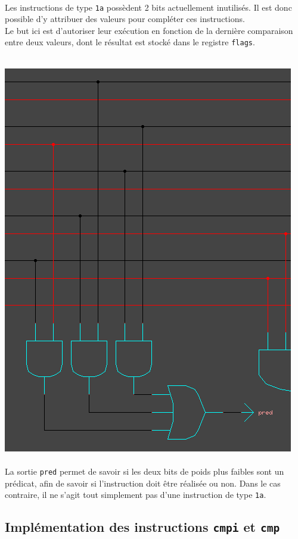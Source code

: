 \documentclass[11pt, a4paper, twoside, titlepage]{article}
\begin{document}
\paragraph{}
Les instructions de type \texttt{1a} possèdent 2 bits actuellement inutilisés. Il est donc possible d'y attribuer des valeurs pour compléter ces instructions.\\
Le but ici est d'autoriser leur exécution en fonction de la dernière comparaison entre deux valeurs, dont le résultat est stocké dans le registre \texttt{flags}.\\
\\
\centerline{\includegraphics[width=.5 \textwidth]{log_pred}}
\paragraph{}
La sortie \texttt{pred} permet de savoir si les deux bits de poids plus faibles sont un prédicat, afin de savoir si l'instruction doit être réalisée ou non. Dans le cas contraire, il ne s'agit tout simplement pas d'une instruction de type \texttt{1a}.

\subsection{Implémentation des instructions \texttt{cmpi} et \texttt{cmp}}
\end{document}
